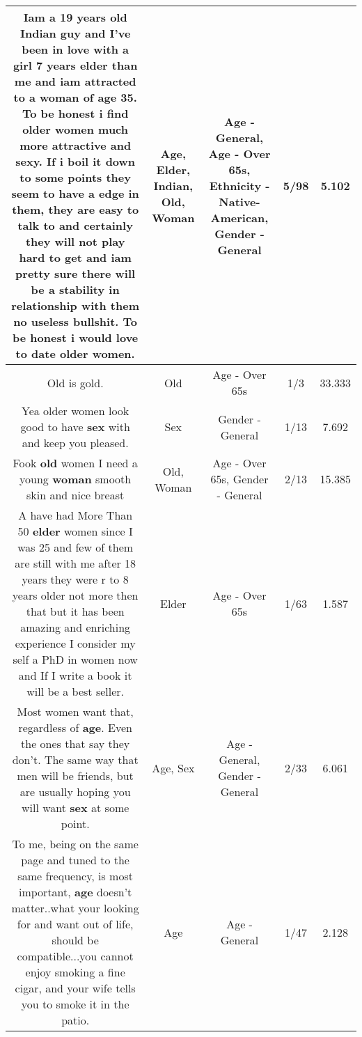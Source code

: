 \documentclass[11pt]{article}
\newlength\mylength
\begin{document}
\begin{center}
\begin{longtable}{|C{.65\mylength}|C{.30\mylength}|C{.12\mylength}|C{.12\mylength}|C{.12\mylength}|}
  \small Iam a 19 years \textbf{old} \textbf{Indian} guy and I've been in love with a girl 7 years \textbf{elder} than me and iam attracted to a \textbf{woman} of \textbf{age} 35.  To be honest i find older women much more attractive and sexy. If i boil it down to some points they seem to have a edge in them, they are easy to talk to and certainly they will not play hard to get and iam pretty sure there will be a stability in relationship with them no useless bullshit. To be honest i would love to date older women.\normalsize   & Age, Elder, Indian, Old, Woman & Age - General, Age - Over 65s, Ethnicity - Native-American, Gender - General & 5/98 & 5.102 \\  \hline
  \small Old is gold.\normalsize   & Old & Age - Over 65s & 1/3 & 33.333 \\  \hline
  \small Yea older women look good to have \textbf{sex} with and keep you pleased.\normalsize   & Sex & Gender - General & 1/13 & 7.692 \\  \hline
  \small Fook \textbf{old} women I need a young \textbf{woman} smooth skin and nice breast\normalsize   & Old, Woman & Age - Over 65s, Gender - General & 2/13 & 15.385 \\  \hline
  \small A have had More Than 50 \textbf{elder} women since I was 25 and few of them are still with me after 18 years they were r to 8 years older not more then that but it has been amazing and enriching experience I consider my self a PhD in women now and If I write a book it will be a best seller.\normalsize   & Elder & Age - Over 65s & 1/63 & 1.587 \\  \hline
  \small Most women want that, regardless of \textbf{age}. Even the ones that say they don't. The same way that men will be friends, but are usually hoping you will want \textbf{sex} at some point.\normalsize   & Age, Sex & Age - General, Gender - General & 2/33 & 6.061 \\  \hline
  \small To me, being on the same page and tuned to the same frequency, is most important, \textbf{age} doesn't matter..what your looking for and want out of life, should be compatible...you cannot enjoy smoking a fine cigar, and your wife tells you to smoke it in the patio.\normalsize   & Age & Age - General & 1/47 & 2.128 \\  \hline

\end{longtable}
\end{center}
\end{document}
